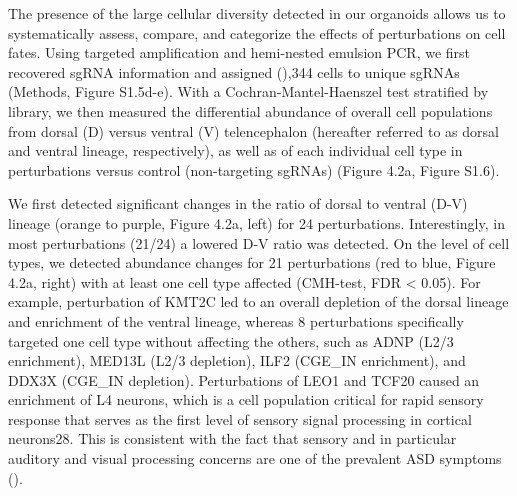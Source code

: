 The presence of the large cellular diversity detected in our organoids allows us to systematically assess, compare, and categorize the effects of perturbations on cell fates. Using targeted amplification and hemi-nested emulsion PCR, we first recovered sgRNA information and assigned (\cite{harris_neocortical_2015}),344 cells to unique sgRNAs (Methods, Figure S1.5d-e). With a Cochran-Mantel-Haenszel test stratified by library, we then measured the differential abundance of overall cell populations from dorsal (D) versus ventral (V) telencephalon (hereafter referred to as dorsal and ventral lineage, respectively), as well as of each individual cell type in perturbations versus control (non-targeting sgRNAs) (Figure 4.2a, Figure S1.6). 

We first detected significant changes in the ratio of dorsal to ventral (D-V) lineage (orange to purple, Figure 4.2a, left) for 24 perturbations. Interestingly, in most perturbations (21/24) a lowered D-V ratio was detected. On the level of cell types, we detected abundance changes for 21 perturbations (red to blue, Figure 4.2a, right) with at least one cell type affected (CMH-test, FDR < 0.05). For example, perturbation of KMT2C led to an overall depletion of the dorsal lineage and enrichment of the ventral lineage, whereas 8 perturbations specifically targeted one cell type without affecting the others, such as ADNP (L2/3 enrichment), MED13L (L2/3 depletion), ILF2 (CGE\_IN enrichment), and DDX3X (CGE\_IN depletion). Perturbations of LEO1 and TCF20 caused an enrichment of L4 neurons, which is a cell population critical for rapid sensory response that serves as the first level of sensory signal processing in cortical neurons28. This is consistent with the fact that sensory and in particular auditory and visual processing concerns are one of the prevalent ASD symptoms (\cite{marco_sensory_2011}). 

